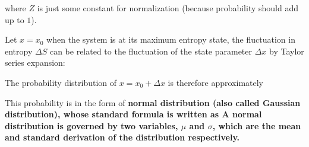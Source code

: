 \documentclass[class=article, crop=false, 12pt]{standalone}
\begin{document}
where $Z$ is just some constant for normalization (because probability should add up to $1$).

Let $x=x_0$ when the system is at its maximum entropy state,
the fluctuation in entropy $\Delta S$ can be related to 
the fluctuation of the state parameter $\Delta x$ by Taylor series expansion:

The probability distribution of $x=x_0+\Delta x$ is therefore approximately

This probability is in the form of \bf{normal distribution} (also called Gaussian distribution),
whose standard formula is written as
A normal distribution is governed by two variables, $\mu$ and $\sigma$, 
which are the mean and standard derivation of the distribution respectively.

\end{document}
